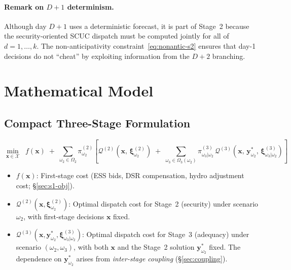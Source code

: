 \documentclass[11pt]{article}
\begin{document}
\paragraph{Remark on $D{+}1$ determinism.}
Although day $D{+}1$ uses a deterministic forecast, it is part of
Stage~2 because the security-oriented SCUC dispatch must be computed
jointly for all of $d = 1, \ldots, k$. The non-anticipativity
constraint~\eqref{eq:nonantic-s2} ensures that day-1 decisions do not
``cheat'' by exploiting information from the $D{+}2$ branching.

\section{Mathematical Model}\label{sec:model}

\subsection{Compact Three-Stage Formulation}

\begin{equation}\label{eq:master}
\boxed{
  \min_{\mathbf{x} \in \mathcal{X}}
  \;\; f(\mathbf{x})
  \;+\; \sum_{\omega_2 \in \Omega_2}
    \pi^{(2)}_{\omega_2}
  \left[
    \mathcal{Q}^{(2)}(\mathbf{x},\,\boldsymbol{\xi}^{(2)}_{\omega_2})
    \;+\; \sum_{\omega_3 \in \Omega_3(\omega_2)}
      \pi^{(3)}_{\omega_3|\omega_2}\,
      \mathcal{Q}^{(3)}(\mathbf{x},\,
        \mathbf{y}^*_{\omega_2},\,
        \boldsymbol{\xi}^{(3)}_{\omega_3|\omega_2})
  \right]
}
\end{equation}

\begin{itemize}
  \item $f(\mathbf{x})$: First-stage cost (ESS bids, DSR compensation,
        hydro adjustment cost; §\ref{sec:s1-obj}).
  \item $\mathcal{Q}^{(2)}(\mathbf{x}, \boldsymbol{\xi}^{(2)}_{\omega_2})$:
        Optimal dispatch cost for Stage~2 (security) under scenario
        $\omega_2$, with first-stage decisions $\mathbf{x}$ fixed.
  \item $\mathcal{Q}^{(3)}(\mathbf{x}, \mathbf{y}^*_{\omega_2},
        \boldsymbol{\xi}^{(3)}_{\omega_3|\omega_2})$:
        Optimal dispatch cost for Stage~3 (adequacy) under scenario
        $(\omega_2, \omega_3)$, with both $\mathbf{x}$ and the
        Stage~2 solution $\mathbf{y}^*_{\omega_2}$ fixed. The
        dependence on $\mathbf{y}^*_{\omega_2}$ arises from
        \emph{inter-stage coupling} (§\ref{sec:coupling}).
\end{itemize}
\end{document}
